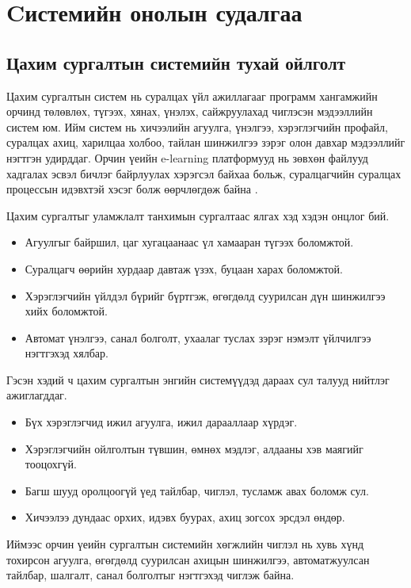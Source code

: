 
\chapter{Cистемийн онолын судалгаа}
\label{Chapter1}

\section{Цахим сургалтын системийн тухай ойлголт}
Цахим сургалтын систем нь суралцах үйл ажиллагааг программ хангамжийн орчинд төлөвлөх, түгээх, хянах, үнэлэх, сайжруулахад чиглэсэн мэдээллийн систем юм. Ийм систем нь хичээлийн агуулга, үнэлгээ, хэрэглэгчийн профайл, суралцах ахиц, харилцаа холбоо, тайлан шинжилгээ зэрэг олон давхар мэдээллийг нэгтгэн удирддаг. Орчин үеийн e-learning платформууд нь зөвхөн файлууд хадгалах эсвэл бичлэг байрлуулах хэрэгсэл байхаа больж, суралцагчийн суралцах процессын идэвхтэй хэсэг болж өөрчлөгдөж байна \cite{elearning}.

Цахим сургалтыг уламжлалт танхимын сургалтаас ялгах хэд хэдэн онцлог бий.
\begin{itemize}
\item Агуулгыг байршил, цаг хугацаанаас үл хамааран түгээх боломжтой.
\item Суралцагч өөрийн хурдаар давтаж үзэх, буцаан харах боломжтой.
\item Хэрэглэгчийн үйлдэл бүрийг бүртгэж, өгөгдөлд суурилсан дүн шинжилгээ хийх боломжтой.
\item Автомат үнэлгээ, санал болголт, ухаалаг туслах зэрэг нэмэлт үйлчилгээ нэгтгэхэд хялбар.
\end{itemize}

Гэсэн хэдий ч цахим сургалтын энгийн системүүдэд дараах сул талууд нийтлэг ажиглагддаг.
\begin{itemize}
\item Бүх хэрэглэгчид ижил агуулга, ижил дарааллаар хүрдэг.
\item Хэрэглэгчийн ойлголтын түвшин, өмнөх мэдлэг, алдааны хэв маягийг тооцохгүй.
\item Багш шууд оролцоогүй үед тайлбар, чиглэл, тусламж авах боломж сул.
\item Хичээлээ дундаас орхих, идэвх буурах, ахиц зогсох эрсдэл өндөр.
\end{itemize}

Иймээс орчин үеийн сургалтын системийн хөгжлийн чиглэл нь хувь хүнд тохирсон агуулга, өгөгдөлд суурилсан ахицын шинжилгээ, автоматжуулсан тайлбар, шалгалт, санал болголтыг нэгтгэхэд чиглэж байна.

